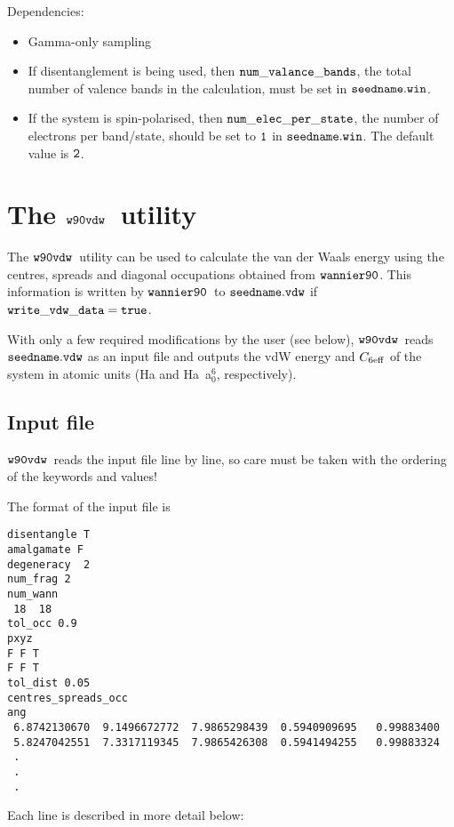 \documentclass{report}
\newcommand{\wvdw}{{$\tt{w90vdw}$}}
\newcommand{\wannier}{{$\tt{wannier90}$}}
\begin{document}
Dependencies:
\begin{itemize}
\item Gamma-only sampling
\item If disentanglement is being used, then $\tt{num\_valance\_bands}$, the
  total number of valence bands in the calculation,
  must be set in $\tt{seedname.win}$.
\item If the system is spin-polarised, then
  $\tt{num\_elec\_per\_state}$, the number of electrons per band/state,
  should be set to $\tt{1}$ in
  $\tt{seedname.win}$. The default value is $\tt{2}$.
\end{itemize}


\section{The \wvdw\ utility}
The \wvdw\ utility can be used to calculate the van der Waals energy
using the centres, spreads and diagonal occupations obtained from
\wannier. This information is written by \wannier\ to
$\tt{seedname.vdw}$ if $\tt{write\_vdw\_data = true}$.

With only a few required modifications by the user (see below),
\wvdw\ reads $\tt{seedname.vdw}$ as an input file and outputs
the vdW energy and $C_{6\rm {eff}}$ of the system in atomic units (Ha
and Ha~a$_0^6$, respectively).

\subsection{Input file}

\wvdw\ reads the input file line by line, so care must be taken with
the ordering of the keywords and values!

The format of the input file is

\begin{verbatim}
disentangle T
amalgamate F
degeneracy  2
num_frag 2
num_wann
 18  18
tol_occ 0.9
pxyz
F F T
F F T
tol_dist 0.05
centres_spreads_occ
ang
 6.8742130670  9.1496672772  7.9865298439  0.5940909695   0.99883400
 5.8247042551  7.3317119345  7.9865426308  0.5941494255   0.99883324
 .
 .
 .
\end{verbatim}

Each line is described in more detail below:
\end{document}
